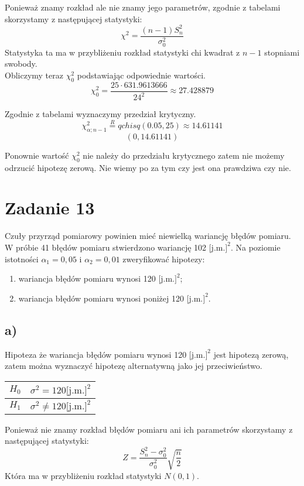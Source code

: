 \documentclass{article}
\begin{document}
Ponieważ znamy rozkład ale nie znamy jego parametrów, zgodnie z tabelami skorzystamy z następującej statystyki:
\[ \chi^2 = \frac{(n-1)S^2_n}{\sigma_0^2} \]
Statystyka ta ma w przybliżeniu rozkład statystyki chi kwadrat z $n-1$ stopniami swobody. \\

Obliczymy teraz $\chi_0^2$ podstawiając odpowiednie wartości.
\[ \chi_0^2 = \frac{25 \cdot 631.9613666}{24^2} \approx 27.428879 \]

Zgodnie z tabelami wyznaczymy przedział krytyczny.
\[ \chi^2_{\alpha;n-1} \overset{R}{=} qchisq(0.05, 25) \approx 14.61141 \]
\[ (0, 14.61141) \]

Ponownie wartość $\chi_0^2$ nie należy do przedziału krytycznego zatem nie możemy odrzucić hipotezę zerową. Nie wiemy po za tym czy jest ona prawdziwa czy nie.

\section{Zadanie 13}
Czuły przyrząd pomiarowy powinien mieć niewielką wariancję błędów pomiaru. W próbie 41 błędów pomiaru stwierdzono wariancję 102 $\text{[j.m.]}^2$. Na poziomie istotności $\alpha_1=0,05$ i $\alpha_2=0,01$ zweryfikować hipotezy:
\begin{enumerate}[label = \alph*)]
\item wariancja błędów pomiaru wynosi 120 $\text{[j.m.]}^2$;
\item wariancja błędów pomiaru wynosi poniżej 120 $\text{[j.m.]}^2$.
\end{enumerate}

\subsection{a)}
Hipoteza że wariancja błędów pomiaru wynosi 120 $\text{[j.m.]}^2$ jest hipotezą zerową, zatem można wyznaczyć hipotezę alternatywną jako jej przeciwieństwo.
\begin{center} \begin{tabular}{|c|c|} \hline
$H_0$ & $\sigma^2 = 120 \text{[j.m.]}^2$ \\ \hline
$H_1$ & $\sigma^2 \neq 120 \text{[j.m.]}^2$ \\ \hline
\end{tabular} \end{center}

Ponieważ nie znamy rozkład błędów pomiaru ani ich parametrów skorzystamy z następującej statystyki:
\[ Z = \frac{S_n^2-\sigma_0^2}{\sigma_0^2} \sqrt{\frac{n}{2}} \]
Która ma w przybliżeniu rozkład statystyki $N(0,1)$.
\end{document}
